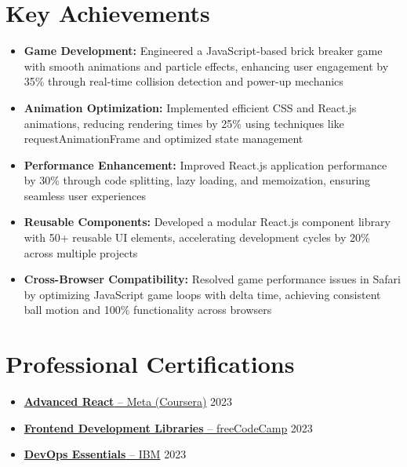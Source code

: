 \documentclass[11pt]{article}
\begin{document}
\section{Key Achievements}
\begin{itemize}
\item \textbf{Game Development:} Engineered a JavaScript-based brick breaker game with smooth animations and particle effects, enhancing user engagement by 35\% through real-time collision detection and power-up mechanics
\item \textbf{Animation Optimization:} Implemented efficient CSS and React.js animations, reducing rendering times by 25\% using techniques like requestAnimationFrame and optimized state management
\item \textbf{Performance Enhancement:} Improved React.js application performance by 30\% through code splitting, lazy loading, and memoization, ensuring seamless user experiences
\item \textbf{Reusable Components:} Developed a modular React.js component library with 50+ reusable UI elements, accelerating development cycles by 20\% across multiple projects
\item \textbf{Cross-Browser Compatibility:} Resolved game performance issues in Safari by optimizing JavaScript game loops with delta time, achieving consistent ball motion and 100\% functionality across browsers
\end{itemize}

\section{Professional Certifications}
\begin{itemize}
\item \href{https://www.coursera.org/account/accomplishments/verify/QC73X86DWCRK}{\textbf{Advanced React} -- Meta (Coursera)} \hfill 2023
\item \href{https://www.freecodecamp.org/certification/fcc36860a3c-366f-4e05-8655-9eeeba048998/front-end-development-libraries}{\textbf{Frontend Development Libraries} -- freeCodeCamp} \hfill 2023
\item \href{https://www.credly.com/badges/41de71d0-506d-4fc4-98b8-3d72b7d4fd44/linked_in_profile}{\textbf{DevOps Essentials} -- IBM} \hfill 2023
\end{itemize}
\end{document}
